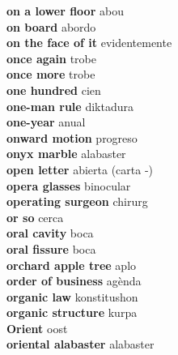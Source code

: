 \textbf{ on a lower floor  } abou \\
\textbf{ on board  } abordo \\
\textbf{ on the face of it  } evidentemente \\
\textbf{ once again  } trobe \\
\textbf{ once more  } trobe \\
\textbf{ one hundred  } cien \\
\textbf{ one-man rule  } diktadura \\
\textbf{ one-year  } anual \\
\textbf{ onward motion  } progreso \\
\textbf{ onyx marble  } alabaster \\
\textbf{ open letter  } abierta (carta -) \\
\textbf{ opera glasses  } binocular \\
\textbf{ operating surgeon  } chirurg \\
\textbf{ or so  } cerca \\
\textbf{ oral cavity  } boca \\
\textbf{ oral fissure  } boca \\
\textbf{ orchard apple tree  } aplo \\
\textbf{ order of business  } agènda \\
\textbf{ organic law  } konstitushon \\
\textbf{ organic structure  } kurpa \\
\textbf{ Orient  } oost \\
\textbf{ oriental alabaster  } alabaster \\
